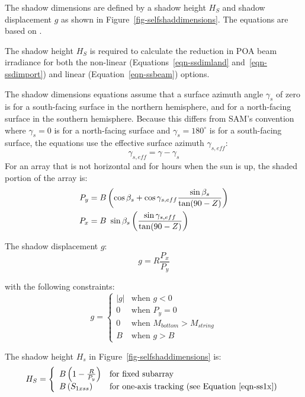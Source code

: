 \documentclass[12pt,letterpaper]{article}
\begin{document}
The shadow dimensions are defined by a shadow height  $H_S$ and shadow displacement $g$ as shown in Figure~\ref{fig-selfshaddimensions}. The equations are based on \citet{appelbaum1979}.

The shadow height $H_S$ is required to calculate the reduction in POA beam irradiance for both the non-linear (Equations~\ref{eqn-ssdimland} and~\ref{eqn-ssdimport}) and linear  (Equation~\ref{eqn-ssbeam}) options. 

The shadow dimensions equations assume that a surface azimuth angle $\gamma_s$ of zero is for a south-facing surface in the northern hemisphere, and for a north-facing surface in the southern hemisphere. Because this differs from SAM's convention where $\gamma_s=0$ is for a north-facing surface and $\gamma_s=180^\circ$ is for a south-facing surface, the equations use the effective surface azimuth $\gamma_{s,eff}$:
\begin{equation}
\gamma_{s,eff} = \gamma - \gamma_s
\end{equation}
For an array that is not horizontal and for hours when the sun is up, the shaded portion of the array is:
\begin{align} \label{eqn-pxpy}
P_y &= B \left(\cos\beta_s + \cos \gamma_{s,eff} \frac{\sin\beta_s}{\tan(90-Z)}\right)\notag\\
P_x &= B~\sin\beta_s \left(\frac{\sin\gamma_{s,eff}}{\tan(90-Z)}\right)
\end{align}

The shadow displacement $g$:
\begin{equation}\label{eqn-shadowdisplacement}
g=R\frac{P_x}{P_y}
\end{equation}

with the following constraints:
\[
g=
  \left\{
    \begin{array}{ll}
      \lvert g\rvert &  \mbox{when $g<0$}\\
      0 & \mbox{when $P_y=0$}\\
      0 & \mbox{when $M_{bottom}>M_{string}$}\\
      B & \mbox{when $g>B$}
    \end{array}
  \right.
\]

The shadow height $H_s$ in Figure~\ref{fig-selfshaddimensions} is:
\begin{equation}\label{eqn-ssshadowheight}
H_S=
	\left\{
	\begin{array}{ll}
	B\left(1-\frac{R}{P_y}\right)&\mbox{for fixed subarray}\\
	B\left(S_{1xss}\right)&\mbox{for one-axis tracking (see Equation~\ref{eqn-ss1x})}
	\end{array}
	\right.
\end{equation}
\end{document}
